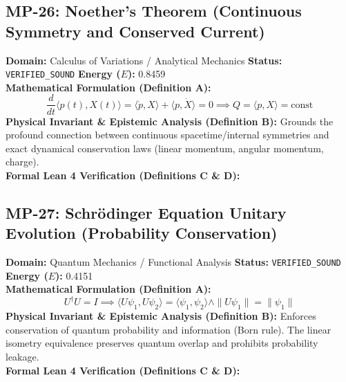 \subsection{MP-26: Noether's Theorem (Continuous Symmetry and Conserved Current)}
\textbf{Domain:} Calculus of Variations / Analytical Mechanics \hfill \textbf{Status:} \texttt{VERIFIED\_SOUND} \hfill \textbf{Energy ($E$):} 0.8459\\
\textbf{Mathematical Formulation (Definition A):}
\begin{equation*}
\frac{d}{dt} \langle p(t), X(t) \rangle = \langle \dot{p}, X \rangle + \langle p, \dot{X} \rangle = 0 \implies Q = \langle p, X \rangle = \text{const}
\end{equation*}
\textbf{Physical Invariant \& Epistemic Analysis (Definition B):}
Grounds the profound connection between continuous spacetime/internal symmetries and exact dynamical conservation laws (linear momentum, angular momentum, charge).\\

\textbf{Formal Lean 4 Verification (Definitions C \& D):}


\vspace{1em}
\subsection{MP-27: Schrödinger Equation Unitary Evolution (Probability Conservation)}
\textbf{Domain:} Quantum Mechanics / Functional Analysis \hfill \textbf{Status:} \texttt{VERIFIED\_SOUND} \hfill \textbf{Energy ($E$):} 0.4151\\
\textbf{Mathematical Formulation (Definition A):}
\begin{equation*}
U^\dagger U = I \implies \langle U\psi_1, U\psi_2 \rangle = \langle \psi_1, \psi_2 \rangle \wedge \|U\psi_1\| = \|\psi_1\|
\end{equation*}
\textbf{Physical Invariant \& Epistemic Analysis (Definition B):}
Enforces conservation of quantum probability and information (Born rule). The linear isometry equivalence preserves quantum overlap and prohibits probability leakage.\\

\textbf{Formal Lean 4 Verification (Definitions C \& D):}


\vspace{1em}
